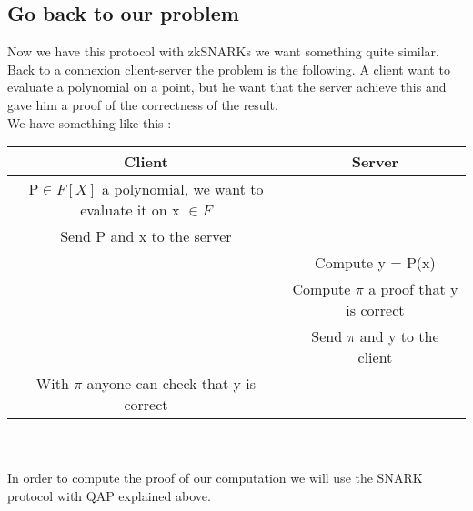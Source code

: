 \newpage
\subsection{Go back to our problem}
Now we have this protocol with zkSNARKs we want something quite similar. Back to a connexion client-server the problem is the following. A client want to evaluate a polynomial on a point, but he want that the server achieve this and gave him a proof of the correctness of the result.
\\We have something like this :
\\

\begin{tabular}{|c|c|}
  \hline
  \textbf{Client} & \textbf{Server} \TBstrut \\
  \hline
  P$\in F[X]$ a polynomial, we want to evaluate it on x $\in F$ & \TBstrut \\ 
  Send P and x to the server & \TBstrut \\
  \hline
     & Compute y = P(x) \TBstrut \\
     & Compute $\pi$ a proof that y is correct \TBstrut \\
     & Send $\pi$ and y to the client \TBstrut \\
    \hline
    With $\pi$ anyone can check that y is correct & \TBstrut \\
  \hline
\end{tabular}
\\
\\
In order to compute the proof of our computation we will use the SNARK protocol with QAP explained above.







